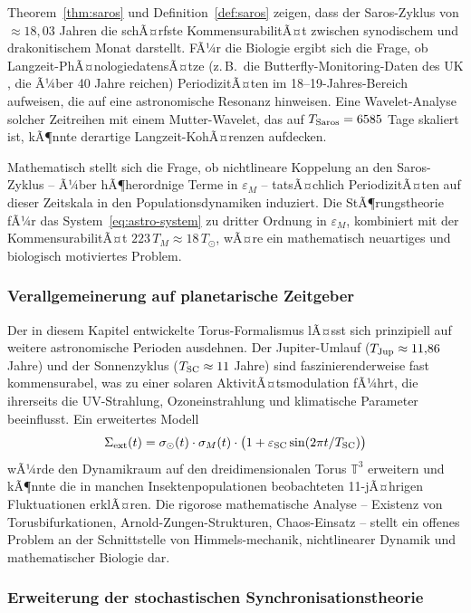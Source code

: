 ﻿\documentclass[12pt, a4paper]{article}
\theoremstyle{definition}
\begin{document}
Theorem~\ref{thm:saros} und Definition~\ref{def:saros} zeigen, dass der
Saros-Zyklus von $\approx 18{,}03$ Jahren die schÃ¤rfste KommensurabilitÃ¤t
zwischen synodischem und drakonitischem Monat darstellt. FÃ¼r die Biologie
ergibt sich die Frage, ob Langzeit-PhÃ¤nologiedatensÃ¤tze (z.\,B.\ die
Butterfly-Monitoring-Daten des UK \cite{Visser2005}, die Ã¼ber 40 Jahre reichen)
PeriodizitÃ¤ten im 18--19-Jahres-Bereich aufweisen, die auf eine astronomische
Resonanz hinweisen. Eine Wavelet-Analyse solcher Zeitreihen mit einem
Mutter-Wavelet, das auf $T_{\rm Saros} = 6585$ Tage skaliert ist, kÃ¶nnte
derartige Langzeit-KohÃ¤renzen aufdecken.

Mathematisch stellt sich die Frage, ob nichtlineare Koppelung an den Saros-Zyklus
-- Ã¼ber hÃ¶herordnige Terme in $\varepsilon_M$ -- tatsÃ¤chlich PeriodizitÃ¤ten auf
dieser Zeitskala in den Populationsdynamiken induziert. Die StÃ¶rungstheorie fÃ¼r
das System~\eqref{eq:astro-system} zu dritter Ordnung in $\varepsilon_M$,
kombiniert mit der KommensurabilitÃ¤t $223\,T_M \approx 18\,T_{\odot}$, wÃ¤re
ein mathematisch neuartiges und biologisch motiviertes Problem.

\subsubsection{Verallgemeinerung auf planetarische Zeitgeber}

Der in diesem Kapitel entwickelte Torus-Formalismus lÃ¤sst sich prinzipiell auf
weitere astronomische Perioden ausdehnen. Der Jupiter-Umlauf ($T_{\rm Jup}
\approx 11{,}86$ Jahre) und der Sonnenzyklus ($T_{\rm SC} \approx 11$ Jahre)
sind faszinierender\-weise fast kommensurabel, was zu einer solaren AktivitÃ¤ts\-modulation
fÃ¼hrt, die ihrerseits die UV-Strahlung, Ozoneinstrahlung und klimatische Parameter
beeinflusst. Ein erweitertes Modell
\[
  \Sigma_{\rm ext}(t) = \sigma_{\odot}(t)\cdot\sigma_M(t)
  \cdot\bigl(1 + \varepsilon_{\rm SC}\sin(2\pi t / T_{\rm SC})\bigr)
\]
wÃ¼rde den Dynamikraum auf den dreidimensionalen Torus $\mathbb{T}^3$ erweitern
und kÃ¶nnte die in manchen Insektenpopulationen beobachteten 11-jÃ¤hrigen Fluktuationen
erklÃ¤ren. Die rigorose mathematische Analyse -- Existenz von Torusbifurkationen,
Arnold-Zungen-Strukturen, Chaos-Einsatz -- stellt ein offenes Problem an der
Schnittstelle von Himmels-mechanik, nichtlinearer Dynamik und mathematischer
Biologie dar.

\subsubsection{Erweiterung der stochastischen Synchronisationstheorie}
\end{document}
